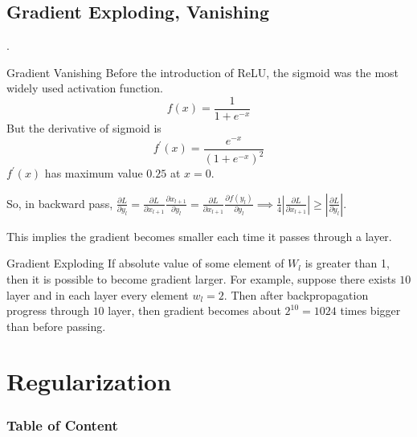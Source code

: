 \documentclass[8pt]{beamer}
\newcommand{\abs}[1]{\left\lvert #1 \right\rvert}
\begin{document}
\subsection{Gradient Exploding, Vanishing}
\begin{frame}{.}

    \begin{block}{Gradient Vanishing}
        Before the introduction of ReLU, the sigmoid was the most widely used activation function.
        \[
            f(x) = \frac{1}{1 + e^{-x}}
        \]
        But the derivative of sigmoid is 
        \[
            f^\prime(x) = \frac{e^{-x}}{(1+ e^{-x})^2}
        \]
        $f^\prime(x)$ has maximum value $0.25$ at $x=0$.

        So, in backward pass, $\frac{\partial L}{\partial y_l} = \frac{\partial L}{\partial x_{l+1}}\frac{\partial x_{l+1}}{\partial y_l} = \frac{\partial L}{\partial x_{l+1}}\frac{\partial f(y_l)}{\partial y_l} \implies \frac{1}{4}\abs{\frac{\partial L}{\partial x_{l+1}}} \geq \abs{\frac{\partial L}{\partial y_l}}$.

        This implies the gradient becomes smaller each time it passes through a layer.
    \end{block}

    \begin{block}{Gradient Exploding}
        If absolute value of some element of $W_l$ is greater than 1, then it is possible to become gradient larger. For example, suppose there exists $10$ layer and in each layer every element $w_l = 2$. Then after backpropagation progress through $10$ layer, then gradient becomes about $2^{10} = 1024$ times bigger than before passing.
    \end{block}

\end{frame}

\section{Regularization}
\begingroup
    \begin{frame}
        \begin{multicols}{2}
            \frametitle{Table of Content}
            \tableofcontents
        \end{multicols}
    \end{frame}
\endgroup
\end{document}
